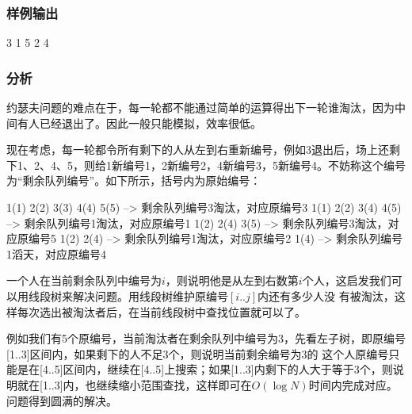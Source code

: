 \subsubsection{样例输出}
\begin{Code}
3 1 5 2 4
\end{Code}

\subsubsection{分析}
约瑟夫问题的难点在于，每一轮都不能通过简单的运算得出下一轮谁淘汰，因为中间有人已经退出了。因此一般只能模拟，效率很低。

现在考虑，每一轮都令所有剩下的人从左到右重新编号，例如3退出后，场上还剩下1、2、4、5，则给1新编号1，2新编号2，4新编号3，5新编号4。不妨称这个编号为“剩余队列编号”。如下所示，括号内为原始编号：
\begin{Code}
1(1) 2(2) 3(3) 4(4) 5(5) --> 剩余队列编号3淘汰，对应原编号3
1(1) 2(2) 3(4) 4(5) --> 剩余队列编号1淘汰，对应原编号1
1(2) 2(4) 3(5) --> 剩余队列编号3淘汰，对应原编号5
1(2) 2(4) --> 剩余队列编号1淘汰，对应原编号2
1(4) --> 剩余队列编号1滔天，对应原编号4
\end{Code}

一个人在当前剩余队列中编号为$i$，则说明他是从左到右数第$i$个人，这启发我们可以用线段树来解决问题。用线段树维护原编号$[i..j]$内还有多少人没 有被淘汰，这样每次选出被淘汰者后，在当前线段树中查找位置就可以了。

例如我们有5个原编号，当前淘汰者在剩余队列中编号为3，先看左子树，即原编号[1..3]区间内，如果剩下的人不足3个，则说明当前剩余编号为3的 这个人原编号只能是在[4..5]区间内，继续在[4..5]上搜索；如果[1..3]内剩下的人大于等于3个，则说明就在[1..3]内，也继续缩小范围查找，这样即可在$O(\log N)$时间内完成对应。问题得到圆满的解决。

